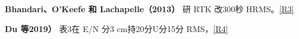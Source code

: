 \documentclass[11pt,a4paper]{article}
\numberwithin{equation}{section}
\numberwithin{figure}{section}
\begin{document}
\textbf{Bhandari{\cjkfont 、}\allowbreak{}O’Keefe {\cjkfont 和}\allowbreak{} Lachapelle{\cjkfont （}\allowbreak{}2013{\cjkfont ）}\allowbreak{}} {\cjkfont 研}\allowbreak{} RTK {\cjkfont 改}\allowbreak{}300{\cjkfont 秒}\allowbreak{} HRMS{\cjkfont 。}\allowbreak{}\hyperlink{ref-R3}{[R3]}

\textbf{Du {\cjkfont 等}\allowbreak{}2019{\cjkfont ）}\allowbreak{}} {\cjkfont 表}\allowbreak{}3{\cjkfont 在}\allowbreak{} E/\allowbreak{}N {\cjkfont 分}\allowbreak{}3 cm{\cjkfont 持}\allowbreak{}20{\cjkfont 分}\allowbreak{}U{\cjkfont 分}\allowbreak{}15{\cjkfont 分}\allowbreak{} RMS{\cjkfont ，}\allowbreak{}\hyperlink{ref-R4}{[R4]}
\end{document}
